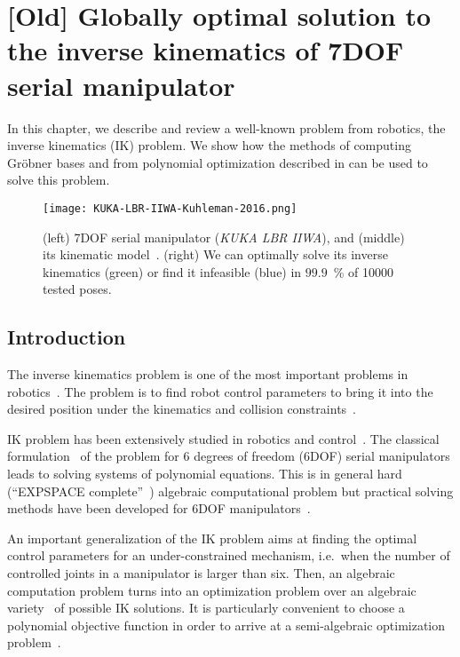 \chapter{[Old] Globally optimal solution to the inverse kinematics of 7DOF serial manipulator}
In this chapter, we describe and review a well-known problem from robotics, the inverse kinematics (IK) problem.
We show how the methods of computing Gr\"obner bases and from polynomial optimization described in  can be used to solve this problem.

\begin{figure}[h]
\texttt{[image: KUKA-LBR-IIWA-Kuhleman-2016.png]} \resizebox{0.48\textwidth}{!}{}
  \caption{(left) 7DOF serial manipulator (\textit{KUKA LBR IIWA}), and (middle) its kinematic model~\cite{Kuhlemann2016}. (right) We can optimally solve its inverse kinematics (green) or find it infeasible (blue) in $99.9$~\% of \num{10000} tested poses.}
\end{figure}

\section{Introduction}
The inverse kinematics problem is one of the most important problems in robotics~\cite{shigley1980theory}.
The problem is to find robot control parameters to bring it into the desired position under the kinematics and collision constraints~\cite{Jazar2007}.

IK problem has been extensively studied in robotics and control~\cite{Raghavan1993InverseKO,Raghavan1995SolvingPS}. The classical formulation~\cite{Raghavan1993InverseKO} of the problem for 6 degrees of freedom (6DOF) serial manipulators leads to solving systems of polynomial equations. This is in general hard (``EXPSPACE complete''~\cite{MAYR1982305}) algebraic computational problem but practical solving methods have been developed for 6DOF manipulators~\cite{Raghavan1993InverseKO,Manocha-Canny1994,Diankov2010}.

An important generalization of the IK problem aims at finding the optimal control parameters for an under-constrained mechanism, i.e.\ when the number of controlled joints in a manipulator is larger than six. Then, an algebraic computation problem turns into an optimization problem over an algebraic variety~\cite{Cox-Little-Shea2015} of possible IK solutions. It is particularly convenient to choose a polynomial objective function in order to arrive at a semi-algebraic optimization problem~\cite{Lasserre}.

